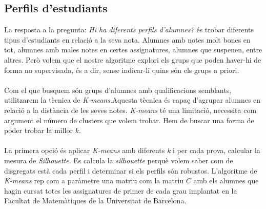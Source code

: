 \documentclass[12pt,a4paper,catalan]{article}
\begin{document}
\newpage
\subsection{Perfils d'estudiants}
\label{subsec:perfilsestudiants}
La resposta a la pregunta: \textit{Hi ha diferents perfils d'alumnes?} és trobar diferents tipus d'estudiants en relació a la seva nota. Alumnes amb notes molt bones en tot, alumnes amb males notes en certes assignatures, alumnes que suspenen, entre altres. Però volem que el nostre algoritme explori els grups que poden haver-hi de forma no supervisada, és a dir, sense indicar-li quins són els grups a priori.
\\
\\
Com el que busquem són grups d'alumnes amb qualificacions semblants, utilitzarem la tècnica de \textit{K-means}.Aquesta tècnica és capaç d'agrupar alumnes en relació a la distància de les seves notes. \textit{K-means} té una limitació, necessita com argument el número de clusters que volem trobar. Hem de buscar una forma de poder trobar la millor $k$.
\\
\\
La primera opció és aplicar \textit{K-means} amb diferents \textit{k} i per cada prova, calcular la mesura de \textit{Silhouette}. Es calcula la \textit{silhouette} perquè volem saber com de disgregats està cada perfil i determinar si els perfils són robustos. L'algoritme de \textit{K-means} rep com a paràmetre una matriu com la matriu $C$ amb els alumnes que hagin cursat totes les assignatures de primer de cada grau implantat en la Facultat de Matemàtiques de la Universitat de Barcelona. 
\end{document}
